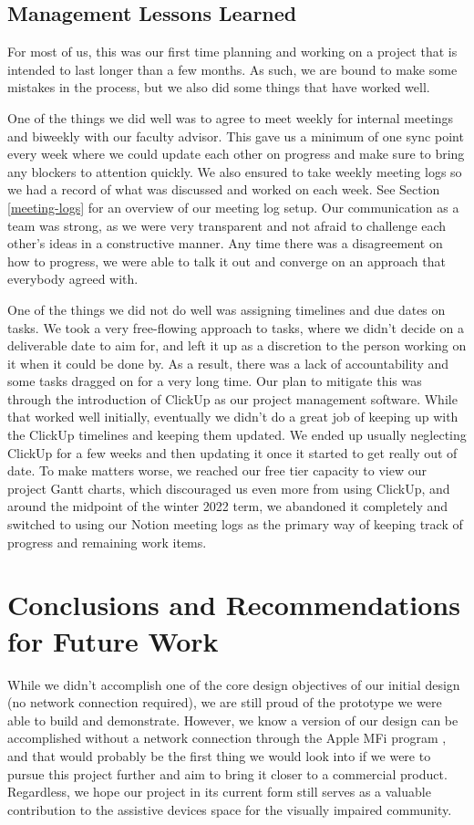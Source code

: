 \documentclass[a4paper,11pt]{article}
\begin{document}
\subsection{Management Lessons Learned}
For most of us, this was our first time planning and working on a project that is intended to last longer than a few months. As such, we are bound to make some mistakes in the process, but we also did some things that have worked well.

One of the things we did well was to agree to meet weekly for internal meetings and biweekly with our faculty advisor. This gave us a minimum of one sync point every week where we could update each other on progress and make sure to bring any blockers to attention quickly. We also ensured to take weekly meeting logs so we had a record of what was discussed and worked on each week. See Section \ref{meeting-logs} for an overview of our meeting log setup. Our communication as a team was strong, as we were very transparent and not afraid to challenge each other's ideas in a constructive manner. Any time there was a disagreement on how to progress, we were able to talk it out and converge on an approach that everybody agreed with.

One of the things we did not do well was assigning timelines and due dates on tasks. We took a very free-flowing approach to tasks, where we didn't decide on a deliverable date to aim for, and left it up as a discretion to the person working on it when it could be done by. As a result, there was a lack of accountability and some tasks dragged on for a very long time. Our plan to mitigate this was through the introduction of ClickUp as our project management software. While that worked well initially, eventually we didn't do a great job of keeping up with the ClickUp timelines and keeping them updated. We ended up usually neglecting ClickUp for a few weeks and then updating it once it started to get really out of date. To make matters worse, we reached our free tier capacity to view our project Gantt charts, which discouraged us even more from using ClickUp, and around the midpoint of the winter 2022 term, we abandoned it completely and switched to using our Notion meeting logs as the primary way of keeping track of progress and remaining work items.

\newpage
\section{Conclusions and Recommendations for Future Work}
While we didn't accomplish one of the core design objectives of our initial design (no network connection required), we are still proud of the prototype we were able to build and demonstrate. However, we know a version of our design can be accomplished without a network connection through the Apple MFi program \cite{apple-mfi}, and that would probably be the first thing we would look into if we were to pursue this project further and aim to bring it closer to a commercial product. Regardless, we hope our project in its current form still serves as a valuable contribution to the assistive devices space for the visually impaired community.
\end{document}
